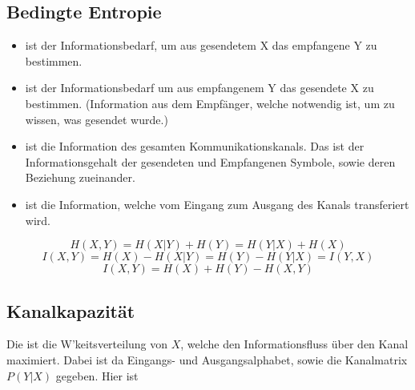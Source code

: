 \documentclass[a4paper]{article}
\begin{document}
\begin{twocolumn}
\subsection{Bedingte Entropie}
\begin{itemize}
  \item {} ist der Informationsbedarf, um aus gesendetem X das empfangene Y zu bestimmen.
  \item {} ist der Informationsbedarf um aus empfangenem Y das gesendete X zu bestimmen.
        (Information aus dem Empfänger, welche notwendig ist, um zu wissen, was gesendet wurde.)
  \item {} ist die Information des gesamten Kommunikationskanals. 
  Das ist der Informationsgehalt der gesendeten und Empfangenen Symbole, sowie deren Beziehung zueinander.
  \item {} ist die Information, welche vom Eingang zum Ausgang des Kanals transferiert wird.
\end{itemize}

\begin{center}
\end{center}

$$H(X,Y) = H(X|Y) + H(Y) = H(Y|X) + H(X)$$
$$I(X,Y) = H(X) - H(X|Y) = H(Y) - H(Y|X) = I(Y,X)$$
$$I(X,Y) = H(X) + H(Y) - H(X,Y)$$

\subsection{Kanalkapazität}
Die  ist die W'keitsverteilung von $X$, welche den Informationsfluss über den 
Kanal maximiert. Dabei ist da Eingangs- und Ausgangsalphabet, sowie die Kanalmatrix $P(Y|X)$ gegeben. Hier ist 


\end{twocolumn}
\end{document}
